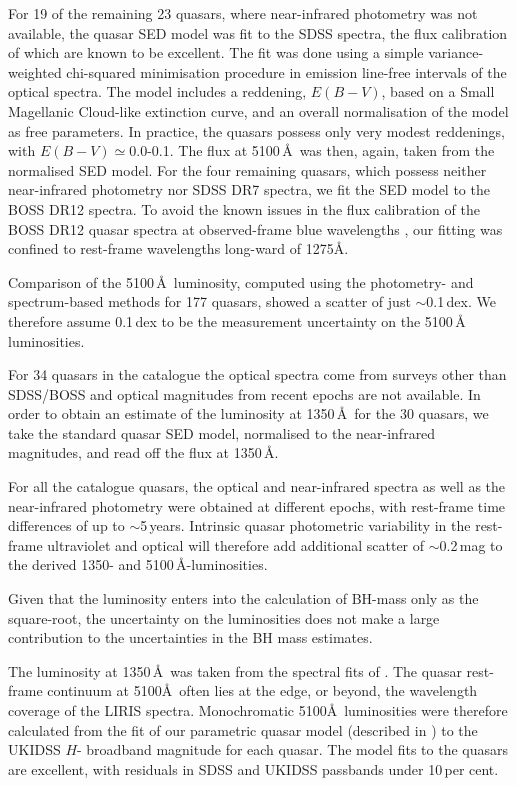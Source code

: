 For 19 of the remaining 23 quasars, where near-infrared photometry was not available, the quasar SED model was fit to the SDSS spectra, the flux calibration of which are known to be excellent.  
The fit was done using a simple variance-weighted chi-squared minimisation procedure in emission line-free intervals of the optical spectra.   
The model includes a reddening, $E(B-V)$, based on a Small Magellanic Cloud-like extinction curve, and an overall normalisation of the model as free parameters.
In practice, the quasars possess only very modest reddenings, with $E(B-V)\simeq$0.0-0.1.
The flux at 5100\,\AA\, was then, again, taken from the normalised SED model.
For the four remaining quasars, which possess neither near-infrared photometry nor SDSS DR7 spectra, we fit the SED model to the BOSS DR12 spectra. 
To avoid the known issues in the flux calibration of the BOSS DR12 quasar spectra at observed-frame blue wavelengths \citep{lee13}, our fitting was confined to rest-frame wavelengths long-ward of 1275\AA. 

Comparison of the 5100\,\AA\, luminosity, computed using the photometry- and spectrum-based methods for 177 quasars, showed a scatter of just $\sim$0.1\,dex.
We therefore assume 0.1\,dex to be the measurement uncertainty on the 5100\,\AA\, luminosities. 

For 34 quasars in the catalogue the optical spectra come from surveys other than SDSS/BOSS and optical magnitudes from recent epochs are not available. 
In order to obtain an estimate of the luminosity at 1350\,\AA\, for the 30 quasars, we take the standard \citet{maddox12} quasar SED model, normalised to the near-infrared magnitudes, and read off the flux at 1350\,\AA. 

For all the catalogue quasars, the optical and near-infrared spectra as well as the near-infrared photometry were obtained at different epochs, with rest-frame time differences of up to $\sim$5\,years. 
Intrinsic quasar photometric variability in the rest-frame ultraviolet and optical will therefore add additional scatter of $\sim$0.2\,mag \citep[e.g.][]{macleod10} to the derived 1350- and 5100\,\AA-luminosities. 

Given that the luminosity enters into the calculation of BH-mass only as the square-root, the uncertainty on the luminosities does not make a large contribution to the uncertainties in the BH mass estimates.  

The luminosity at 1350\,\AA\, was taken from the spectral fits of \citet{shen11}.
The quasar rest-frame continuum at 5100\AA \ often lies at the edge, or beyond, the wavelength coverage of the LIRIS spectra. 
Monochromatic 5100\AA \ luminosities were therefore calculated from the fit of our parametric quasar model (described in \citet{maddox12}) to the UKIDSS $H$- broadband magnitude for each quasar. 
The model fits to the quasars are excellent, with residuals in SDSS and UKIDSS passbands under 10\,per cent.


